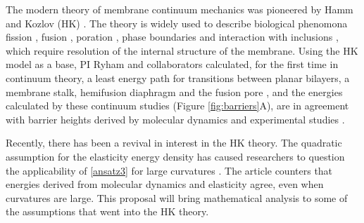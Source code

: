 The modern theory of membrane continuum mechanics 
was pioneered by Hamm and Kozlov (HK) \cite{Hamm2000}.
The theory is widely used to describe biological phenomona 
fission \cite{FrEsAkSh15, Maetal15, PhysRevE.79.031926},
fusion \cite{ChKo08, KoKo2002,Kuzmin7235,Aeffner2012},
poration \cite{Gaetal20}, phase boundaries and interaction with inclusions
\cite{SeLeMaEg17,Saetal20, Pietal20}, which require resolution of the internal structure of the membrane.  
Using the HK  model as a base,
PI Ryham and collaborators calculated, for the first time in continuum theory, a least energy path for transitions between planar bilayers, a membrane stalk,
hemifusion diaphragm and the fusion pore \cite{RyWaCo13,RyKlYaCo16},
and the energies calculated by these continuum studies (Figure \ref{fig:barriers}A),
are in agreement with barrier heights derived by molecular dynamics and experimental studies \cite{FrRoPi17}.  

Recently, there has been a revival in interest in the HK theory. The quadratic assumption
for the elasticity energy density has caused researchers to question the applicability of \eqref{ansatz3} for large curvatures \cite{PhysRevLett.117.188102, ARGUDO20161619}. 
The article \cite{C9SM02079A} counters that energies derived from molecular dynamics and elasticity agree, even when curvatures are large.
This proposal will bring mathematical analysis to some of the assumptions 
that went into the HK theory. 

\begin{figure}
  \caption{
    }
\end{figure}

